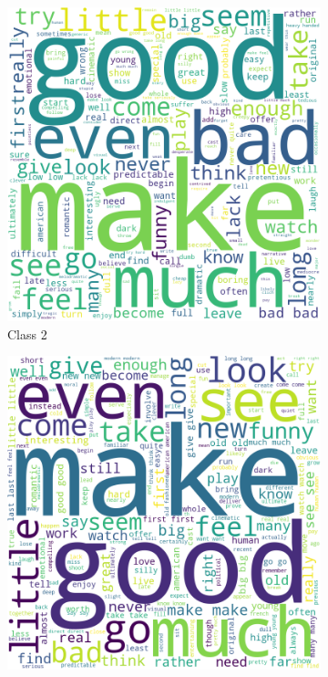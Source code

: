 \documentclass[10pt, a4paper]{article}
\begin{document}
\begin{figure}[h]
\begin{subfigure}[b]{0.18\textwidth}
         \includegraphics[width=\textwidth]{keywords2.png}
         \caption{Class 2}
         \label{fig:class2cloud}
     \end{subfigure}
     \hfill
     \begin{subfigure}[b]{0.18\textwidth}
         \centering
         \includegraphics[width=\textwidth]{keywords3.png}

\end{subfigure}
\end{figure}
\end{document}
